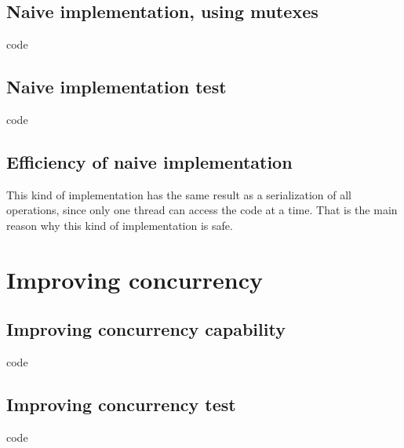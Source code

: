 \documentclass{article}
\begin{document}
\subsection{Naive implementation, using mutexes}

code

\subsection{Naive implementation test}

code

\subsection{Efficiency of naive implementation}

This kind of implementation has the same result as a serialization of all operations, since 
only one thread can access the code at a time. That is the main reason why this kind of 
implementation is safe.

\section{Improving concurrency}

\subsection{Improving concurrency capability}

code

\subsection{Improving concurrency test}

code
\end{document}
